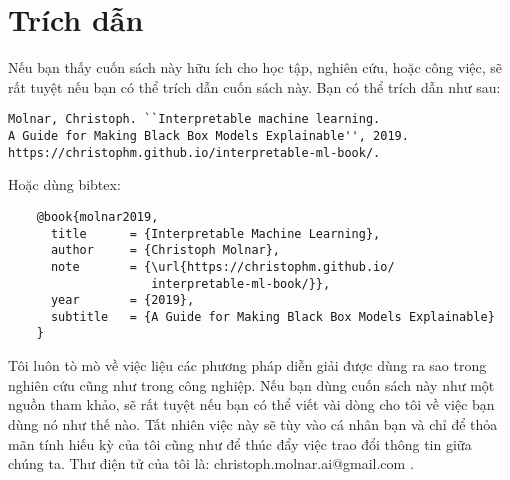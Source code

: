 \chapter{Trích dẫn}

Nếu bạn thấy cuốn sách này hữu ích cho học tập, nghiên cứu, hoặc công việc, sẽ rất tuyệt nếu bạn có thể trích dẫn cuốn sách này. Bạn có thể trích dẫn như sau:
\begin{verbatim}
Molnar, Christoph. ``Interpretable machine learning. 
A Guide for Making Black Box Models Explainable'', 2019.
https://christophm.github.io/interpretable-ml-book/.
\end{verbatim} 
Hoặc dùng bibtex:
\begin{verbatim}
    @book{molnar2019,
      title      = {Interpretable Machine Learning},
      author     = {Christoph Molnar},
      note       = {\url{https://christophm.github.io/
                    interpretable-ml-book/}},
      year       = {2019},
      subtitle   = {A Guide for Making Black Box Models Explainable}
    }
\end{verbatim}

    
Tôi luôn tò mò về việc liệu các phương pháp diễn giải được dùng ra sao trong nghiên cứu cũng như trong công nghiệp. Nếu bạn dùng  cuốn sách này như một nguồn tham khảo, sẽ rất tuyệt nếu bạn có thể viết vài dòng cho tôi về việc bạn dùng nó như thế nào. Tất nhiên việc này sẽ tùy vào cá nhân bạn và chỉ để thỏa mãn tính hiếu kỳ của tôi cũng như để thúc đẩy việc trao đổi thông tin giữa chúng ta. Thư điện tử của tôi là: christoph.molnar.ai@gmail.com .